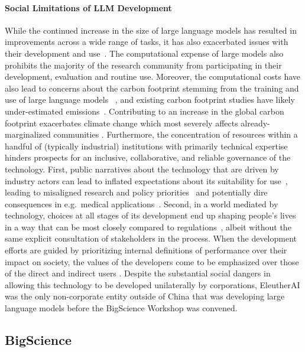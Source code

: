 \documentclass[twoside,11pt]{article}
\begin{document}
\paragraph{Social Limitations of LLM Development}
While the continued increase in the size of large language models 
has resulted in improvements
across a wide range of tasks,
it has also 
exacerbated issues with their development and use~\citep{bender2021dangers}. The computational expense of large models also prohibits the majority of the research community from participating in their development, evaluation and routine use.
Moreover, the computational costs have also lead to concerns about the carbon footprint stemming from the training and use of large language models
~\citep{strubell2019energy,lacoste2019quantifying,schwartz2020green,bannour-etal-2021-evaluating}, and existing carbon footprint studies have likely under-estimated emissions~\citep{bannour-etal-2021-evaluating}. 
Contributing to an increase in the global carbon footprint exacerbates climate change which most severely affects already-marginalized communities \citep{westra2001faces}.
Furthermore, the concentration of resources within a handful of (typically industrial) institutions with primarily technical expertise hinders prospects for an inclusive, collaborative, and reliable governance of the technology. First, public narratives about the technology that are driven by industry actors can lead to inflated expectations about its suitability for use~\citep{brennen2018hype,brennen2022expect}, leading to misaligned research and policy priorities~\citep{raji2022fallacy} and potentially dire consequences in e.g.\ medical applications~\citep{wong2021sepsis}. Second, in a world mediated by technology, choices at all stages of its development end up shaping people's lives in a way that can be most closely compared to regulations~\citep{winner1977technology,winner2017artifacts}, albeit without the same explicit consultation of stakeholders in the process. 
When the development efforts are guided by prioritizing internal definitions of performance over their impact on society, the values of the developers come to be emphasized over those of the direct and indirect users \citep{birhane2022values}.
Despite the substantial social dangers in allowing this technology to be developed unilaterally by corporations, EleutherAI \citep{phang2022eleutherai} was the only non-corporate entity outside of China that was developing large language models before the BigScience Workshop was convened.

\subsection{BigScience}\label{sec:organization}
\end{document}

